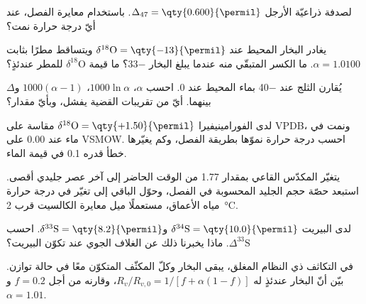 \begin{exercise}[$\star$]\label{exo:b3:stable-isotopes:4}
لصدفة ذراعيّة الأرجل $\Delta_{47} = \qty{0.600}{\permil}$. باستخدام معايرة
الفصل، عند أيّ درجة حرارة نمت؟
\end{exercise}

\begin{exercise}[$\star\star$]\label{exo:b3:stable-isotopes:5}
يغادر البخار المحيط عند $\delta^{18}\mathrm O = \qty{-13}{\permil}$ ويتساقط
مطرًا بثابت $\alpha = 1.0100$. ما الكسر المتبقّي منه عندما
يبلغ البخار \qty{-33}{\permil}؟ ما قيمة $\delta^{18}\mathrm O$ للمطر
عندئذٍ؟
\end{exercise}

\begin{exercise}[$\star\star$]\label{exo:b3:stable-isotopes:6}
يُقارن الثلج عند \qty{-40}{\permil} بماء المحيط عند 0. احسب $\alpha$،
$1000\ln\alpha$، $1000(\alpha - 1)$ و$\Delta$ بينهما. أيّ من
تقريبات القضية يفشل، وبأيّ مقدار؟
\end{exercise}

\begin{exercise}[$\star\star$]\label{exo:b3:stable-isotopes:7}
لدى الفورامينيفيرا $\delta^{18}\mathrm O = \qty{+1.50}{\permil}$ مقاسة على VPDB، ونمت في
ماء عند \qty{0.00}{\permil} على VSMOW. احسب درجة حرارة نموّها بطريقة
الفصل، وكم يغيّرها خطأ قدره \qty{0.1}{\permil} في
قيمة الماء.
\end{exercise}

\begin{exercise}[$\star\star$]\label{exo:b3:stable-isotopes:8}
يتغيّر المكدّس القاعي بمقدار \qty{1.77}{\permil} من الوقت الحاضر إلى آخر
عصر جليدي أقصى. استبعد حصّة حجم الجليد المحسوبة في الفصل،
وحوّل الباقي إلى تغيّر في درجة حرارة مياه الأعماق، مستعملًا ميل
معايرة الكالسيت قرب \qty{2}{\celsius}.
\end{exercise}

\begin{exercise}[$\star\star$]\label{exo:b3:stable-isotopes:9}
لدى البيريت $\delta^{34}\mathrm S = \qty{10.0}{\permil}$ و$\delta^{33}\mathrm S =
\qty{8.2}{\permil}$. احسب $\Delta^{33}\mathrm S$. ماذا يخبرنا ذلك عن
الغلاف الجوي عند تكوّن البيريت؟
\end{exercise}

\begin{exercise}[$\star\star\star$]\label{exo:b3:stable-isotopes:10}
في التكاثف ذي النظام المغلق، يبقى البخار وكلّ المكثّف المتكوّن
معًا في حالة توازن. بيّن أنّ البخار عندئذٍ له $R_v/R_{v,0} = 1/[f +
\alpha(1 - f)]$، وقارنه  من أجل $f = 0.2$
و$\alpha = 1.01$.
\end{exercise}

